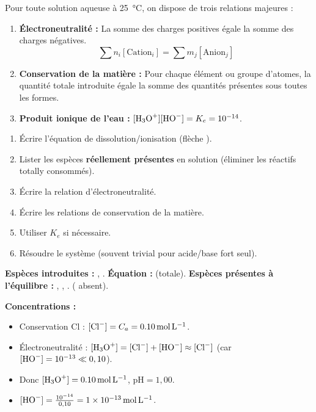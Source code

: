 \documentclass[11pt]{article}
\begin{document}
\begin{propriete}
Pour toute solution aqueuse à \SI{25}{\celsius}, on dispose de trois relations majeures :
\begin{enumerate}
  \item \textbf{Électroneutralité :} La somme des charges positives égale la somme des charges négatives.
  \[ \sum n_i [\text{Cation}_i] = \sum m_j [\text{Anion}_j] \]
  \item \textbf{Conservation de la matière :} Pour chaque élément ou groupe d'atomes, la quantité totale introduite égale la somme des quantités présentes sous toutes les formes.
  \item \textbf{Produit ionique de l'eau :} $[\ce{H3O+}][\ce{HO-}] = K_e = 10^{-14}$.
\end{enumerate}
\end{propriete}

\begin{methode}
\begin{enumerate}
  \item Écrire l'équation de dissolution/ionisation (flèche \ce{->}).
  \item Lister les espèces \textbf{réellement présentes} en solution (éliminer les réactifs totally consommés).
  \item Écrire la relation d'électroneutralité.
  \item Écrire les relations de conservation de la matière.
  \item Utiliser $K_e$ si nécessaire.
  \item Résoudre le système (souvent trivial pour acide/base fort seul).
\end{enumerate}
\end{methode}

\begin{exemplebox}
\textbf{Espèces introduites :} , .
\textbf{Équation :}  (totale).
\textbf{Espèces présentes à l'équilibre :} , , . ( absent).
\par
\textbf{Concentrations :}
\begin{itemize}
  \item Conservation Cl : $[\ce{Cl-}] = C_a = \SI{0,10}{mol.L^{-1}}$.
  \item Électroneutralité : $[\ce{H3O+}] = [\ce{Cl-}] + [\ce{HO-}] \approx [\ce{Cl-}]$ (car $[\ce{HO-}] = 10^{-13} \ll 0,10$).
  \item Donc $[\ce{H3O+}] = \SI{0,10}{mol.L^{-1}}$, $\mathrm{pH} = 1,00$.
  \item $[\ce{HO-}] = \frac{10^{-14}}{0,10} = \SI{1e-13}{mol.L^{-1}}$.
\end{itemize}
\end{exemplebox}
\end{document}
